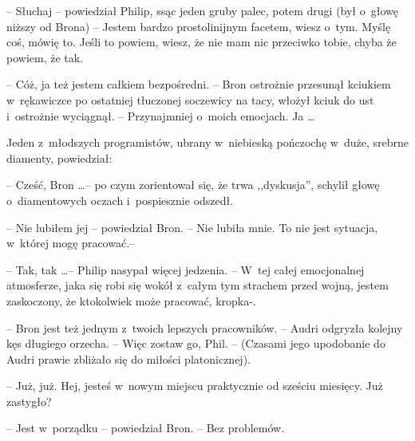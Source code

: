 \documentclass[oneside,polish,11pt,rmheadings]{mwbk}
\begin{document}
-- Słuchaj -- powiedział Philip, ssąc jeden gruby palec, potem drugi (był o~głowę niższy od Brona) -- Jestem bardzo prostolinijnym facetem, wiesz o~tym. Myślę coś, mówię to. Jeśli to powiem, wiesz, że nie mam nic przeciwko tobie, chyba że powiem, że tak. 

-- Cóż, ja też jestem całkiem bezpośredni. -- Bron ostrożnie przesunął kciukiem w~rękawiczce po ostatniej tłuczonej soczewicy na tacy, włożył kciuk do ust i~ostrożnie wyciągnął. -- Przynajmniej o~moich emocjach. Ja \ldots  

Jeden z~młodszych programistów, ubrany w~niebieską pończochę w~duże, srebrne diamenty, powiedział: 

-- Cześć, Bron \ldots  -- po czym zorientował się, że trwa ,,dyskusja'', schylił głowę o~diamentowych oczach i~pospiesznie odszedł. 

-- Nie lubiłem jej -- powiedział Bron. -- Nie lubiła mnie. To nie jest sytuacja, w~której mogę pracować.-- 

-- Tak, tak \ldots  -- Philip nasypał więcej jedzenia. -- W~tej całej emocjonalnej atmosferze, jaka się robi się wokół z~całym tym strachem przed wojną, jestem zaskoczony, że ktokolwiek może pracować, kropka-. 

-- Bron jest też jednym z~twoich lepszych pracowników. -- Audri odgryzła kolejny kęs długiego orzecha.  -- Więc zostaw go, Phil. -- (Czasami jego upodobanie do Audri prawie zbliżało się do miłości platonicznej). 

-- Już,  już. Hej, jesteś w~nowym miejscu praktycznie od sześciu miesięcy. Już zastygło? 

-- Jest w~porządku -- powiedział Bron. -- Bez problemów. 
\end{document}
